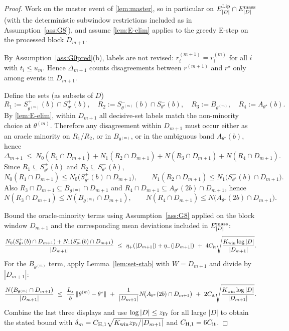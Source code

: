 \documentclass{statsoc}
\newcommand{\1}{\mathbbm{1}}
\begin{document}
\begin{proof}
Work on the master event of \cref{lem:master}, so in particular on
$E^{\rm Lip}_{|D|}\cap E^{\rm mass}_{|D|}$ (with the deterministic subwindow restrictions included as in
Assumption~\ref{ass:G8}), and assume \cref{lem:E-elim} applies to the greedy E-step on the processed block $D_{m+1}$.

By Assumption~\ref{ass:G0pred}(b), labels are not revised: $r^{(m+1)}_i=r^{(m)}_i$ for all $i$ with $t_i\le u_m$.
Hence $\Delta_{m+1}$ counts disagreements between $r^{(m+1)}$ and $r^\star$ only among events in $D_{m+1}$.

Define the sets (as subsets of $D$)
\[
R_1:=S_{\theta^{(m)}}^+(b)\cap S_{\theta^\star}^+(b),\quad
R_2:=S_{\theta^{(m)}}^-(b)\cap S_{\theta^\star}^-(b),\quad
R_3:=B_{\theta^{(m)}},\quad
R_4:=A_{\theta^\star}(b).
\]
By \cref{lem:E-elim}, within $D_{m+1}$ all decisive-set labels match the non-minority choice at $\theta^{(m)}$.
Therefore any disagreement within $D_{m+1}$ must occur either as an oracle minority on $R_1$/$R_2$,
or in $B_{\theta^{(m)}}$, or in the ambiguous band $A_{\theta^\star}(b)$, hence
\[
\Delta_{m+1}
\ \le\ N_0(R_1\cap D_{m+1})+N_1(R_2\cap D_{m+1})+N(R_3\cap D_{m+1})+N(R_4\cap D_{m+1}).
\]
Since $R_1\subseteq S_{\theta^\star}^+(b)$ and $R_2\subseteq S_{\theta^\star}^-(b)$,
\[
N_0(R_1\cap D_{m+1})\le N_0\!\big(S_{\theta^\star}^+(b)\cap D_{m+1}\big),\qquad
N_1(R_2\cap D_{m+1})\le N_1\!\big(S_{\theta^\star}^-(b)\cap D_{m+1}\big).
\]
Also $R_3\cap D_{m+1}\subseteq B_{\theta^{(m)}}\cap D_{m+1}$ and
$R_4\cap D_{m+1}\subseteq A_{\theta^\star}(2b)\cap D_{m+1}$, hence
\[
N(R_3\cap D_{m+1})\le N(B_{\theta^{(m)}}\cap D_{m+1}),\qquad
N(R_4\cap D_{m+1})\le N\!\big(A_{\theta^\star}(2b)\cap D_{m+1}\big).
\]

Bound the oracle-minority terms using Assumption~\ref{ass:G8} applied on the block window $D_{m+1}$ and the corresponding
mean deviations included in $E^{\rm mass}_{|D|}$:
\[
\frac{N_0(S_{\theta^\star}^+(b)\cap D_{m+1})+N_1(S_{\theta^\star}^-(b)\cap D_{m+1})}{|D_{m+1}|}
\ \le\ \eta_+(|D_{m+1}|)+\eta_-(|D_{m+1}|)\ +\ 4C_{\rm it}\sqrt{\frac{K_{\rm win}\log|D|}{|D_{m+1}|}}.
\]
For the $B_{\theta^{(m)}}$ term, apply Lemma~\ref{lem:set-stab} with $W=D_{m+1}$ and divide by $|D_{m+1}|$:
\[
\frac{N(B_{\theta^{(m)}}\cap D_{m+1})}{|D_{m+1}|}
\ \le\ \frac{L_s}{b}\,\|\theta^{(m)}-\theta^\star\|
\ +\ \frac{1}{|D_{m+1}|}N\!\big(A_{\theta^\star}(2b)\cap D_{m+1}\big)
\ +\ 2C_{\rm it}\sqrt{\frac{K_{\rm win}\log|D|}{|D_{m+1}|}}.
\]
Combine the last three displays and use $\log|D|\le z_{\rm Fr}$ for all large $|D|$ to obtain the stated bound
with $\delta_m=C_{\rm H,1}\sqrt{K_{\rm win}z_{\rm Fr}/|D_{m+1}|}$ and $C_{\rm H,1}=6C_{\rm it}$.
\end{proof}
\end{document}
